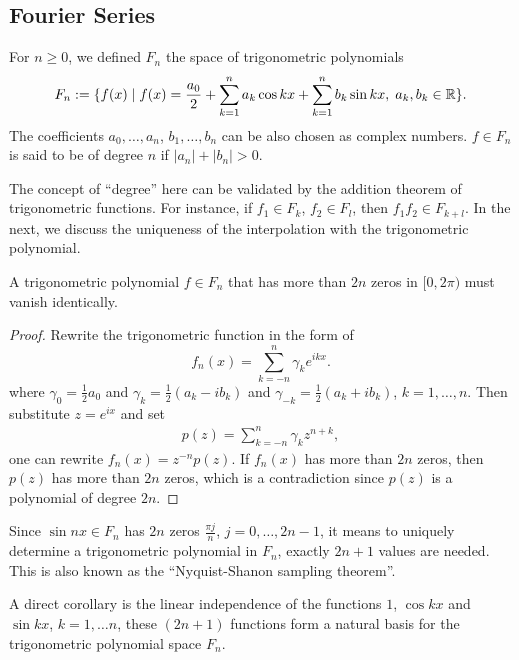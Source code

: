\subsection{Fourier Series}
\label{SSec: 2-Fou-Ser}
\begin{definition}
    For $n\ge 0$, we defined $F_n$ the space of trigonometric polynomials 
    \begin{equation}
        F_n := \{f(x) \mid f(x) = \frac{a_0}{2} + \sum_{k=1}^n a_k \cos kx + \sum_{k=1}^n b_k \sin kx,\; a_k, b_k\in\mathbb R\}.
    \end{equation}
    The coefficients $a_0,\dots, a_n$, $b_1,\dots, b_n$ can be also chosen as complex numbers. $f\in F_n$ is said to be of degree $n$ if $|a_n| + |b_n| > 0$.
\end{definition}
The concept of ``degree'' here can be validated by the addition theorem of trigonometric functions. For instance, if $f_1\in F_k$, $f_2\in F_l$, then $f_1 f_2 \in F_{k+l}$. In the next, we discuss the uniqueness of the interpolation with the trigonometric polynomial.
\begin{lemma}
\label{Lem: 2-Tri-pl-zer}
    A trigonometric polynomial $f\in F_n$ that has more than $2n$ zeros in $[0, 2\pi)$ must vanish identically.
\end{lemma}
\begin{proof}
    Rewrite the trigonometric function in the form of 
    \begin{equation}\label{EQ: COMPLEX}
        f_n(x) = \sum_{k=-n}^{n} \gamma_k e^{ik x}. 
    \end{equation}
    where $\gamma_0 = \frac{1}{2}a_0$ and $\gamma_{k} = \frac{1}{2}(a_k - ib_k)$ and $\gamma_{-k} = \frac{1}{2}(a_k + i b_k)$, $k=1,\dots, n$. Then substitute $z = e^{ix}$ and set 
    \begin{eqnarray}
        p(z) = \sum_{k = -n}^n \gamma_k z^{n + k}, 
    \end{eqnarray}
    one can rewrite $f_n(x) = z^{-n} p(z)$. If $f_n(x)$ has more than $2n$ zeros, then $p(z)$ has more than $2n$ zeros, which is a contradiction since $p(z)$ is a polynomial of degree $2n$.
\end{proof}
\begin{remark}
    Since $\sin nx\in F_n$ has $2n$ zeros $\frac{\pi j}{n}$, $j=0,\dots, 2n-1$, it means to uniquely determine a trigonometric polynomial in $F_n$, exactly $2n+1$ values are needed. This is also known as the ``Nyquist-Shanon sampling theorem''.
\end{remark}
A direct corollary is the linear independence of the functions $1$, $\cos k x$ and $\sin k x$, $k = 1, \dots n$, these $(2n+1)$ functions form a natural basis for the trigonometric polynomial space $F_n$. 
